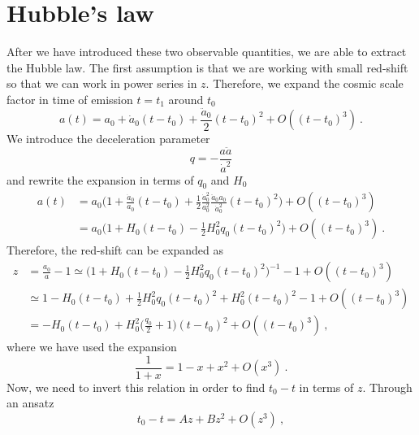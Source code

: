 \section{Hubble's law}

    After we have introduced these two observable quantities, we are able to extract the Hubble law. The first assumption is that we are working with small red-shift so that we can work in power series in $z$. Therefore, we expand the cosmic scale factor in time of emission $t=t_1$ around $t_0$
    \begin{equation*}
        a(t) = a_0 + \dot a_0 (t-t_0) + \frac{\ddot a_0}{2} (t-t_0)^2 + O((t-t_0)^3) ~.
    \end{equation*}
    We introduce the deceleration parameter 
    \begin{equation*}
        q = - \frac{a \ddot a}{\dot a^2} 
    \end{equation*}
    and rewrite the expansion in terms of $q_0$ and $H_0$
    \begin{equation*}
    \begin{aligned}
        a(t) & = a_0 \Big ( 1 + \frac{\dot a_0}{a_0} (t-t_0) + \frac{1}{2} \frac{\dot a_0^2}{a_0^2} \frac{\ddot a_0 a_0}{\dot a_0^2} (t-t_0)^2 \Big ) + O((t-t_0)^3) \\ & = a_0 \Big ( 1 + H_0 (t-t_0) - \frac{1}{2} H_0^2 q_0 (t-t_0)^2 \Big ) + O((t-t_0)^3) ~.
    \end{aligned}
    \end{equation*}
    Therefore, the red-shift can be expanded as 
    \begin{equation*}
    \begin{aligned}
        z & = \frac{a_0}{a} - 1 \simeq \Big ( 1 + H_0 (t-t_0) - \frac{1}{2} H_0^2 q_0 (t-t_0)^2 \Big)^{-1} - 1 + O((t-t_0)^3) \\ & \simeq 1 - H_0 (t-t_0) + \frac{1}{2} H_0^2 q_0 (t-t_0)^2 + H_0^2 (t-t_0)^2 - 1 + O((t-t_0)^3) \\ & = - H_0 (t-t_0) + H_0^2 \Big ( \frac{q_0}{2} + 1 \Big ) (t-t_0)^2 + O((t-t_0)^3) ~,
    \end{aligned}
    \end{equation*}
    where we have used the expansion 
    \begin{equation*}
        \frac{1}{1 + x} = 1 - x + x^2 + O(x^3) ~.
    \end{equation*}
    Now, we need to invert this relation in order to find $t_0-t$ in terms of $z$. Through an ansatz 
    \begin{equation*}
        t_0 - t = A z + B z^2 + O(z^3) ~,
    \end{equation*}
